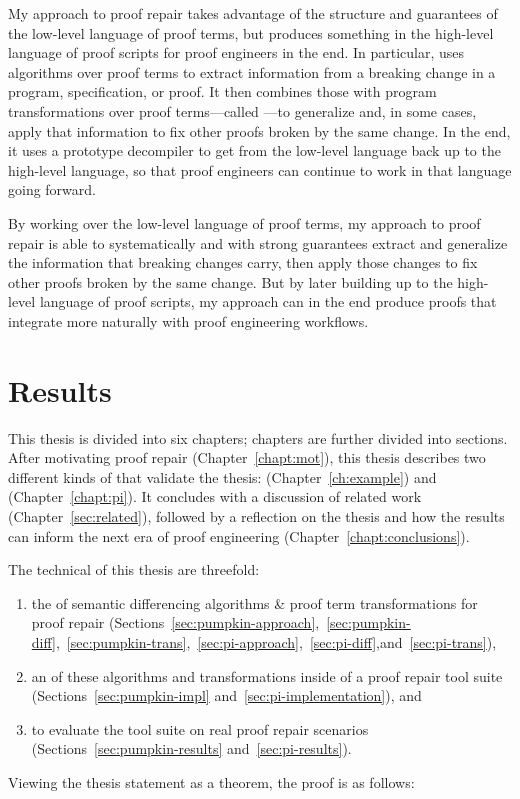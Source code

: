 My approach to proof repair takes advantage of the structure and guarantees of the low-level language of proof terms,
but produces something in the high-level language of proof scripts for proof engineers in the end.
In particular, uses  algorithms over proof terms
to extract information from a breaking change in a program, specification, or proof.
It then combines those with program transformations over proof terms---called ---to
generalize and, in some cases, apply that information to fix other  proofs broken by the same change.
In the end, it uses a prototype decompiler to get from the low-level language back up to the high-level language,
so that proof engineers can continue to work in that language going forward. %

By working over the low-level language of proof terms,
my approach to proof repair is able to systematically and with strong guarantees extract and generalize the information that breaking changes carry,
then apply those changes to fix other proofs broken by the same change.
But by later building up to the high-level language of proof scripts,
my approach can in the end produce proofs that integrate more naturally with proof engineering workflows.

\section{Results}
\label{sec:intro-results}

This thesis is divided into six chapters; chapters are further divided into sections.
After motivating proof repair (Chapter~\ref{chapt:mot}),
this thesis describes two different kinds of  that validate the thesis:
 (Chapter~\ref{ch:example}) and  (Chapter~\ref{chapt:pi}).
It concludes with a discussion of related work (Chapter~\ref{sec:related}),
followed by a reflection on the thesis and how the results can inform the next era of 
proof engineering (Chapter~\ref{chapt:conclusions}).

The technical  of this thesis are threefold:

\begin{enumerate}
\item the  of semantic differencing algorithms \& proof term transformations for proof repair (Sections~\ref{sec:pumpkin-approach},~\ref{sec:pumpkin-diff},~\ref{sec:pumpkin-trans},~\ref{sec:pi-approach},~\ref{sec:pi-diff},and~\ref{sec:pi-trans}),
\item an  of these algorithms and transformations inside of a proof repair tool suite (Sections~\ref{sec:pumpkin-impl} and~\ref{sec:pi-implementation}), and
\item {} to evaluate the tool suite on real proof repair scenarios (Sections~\ref{sec:pumpkin-results} and~\ref{sec:pi-results}).
\end{enumerate}
Viewing the thesis statement as a theorem, the proof is as follows: %


